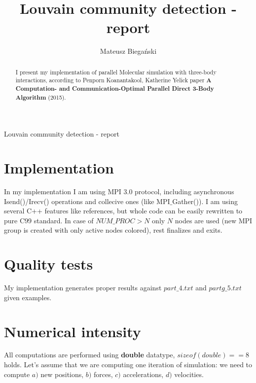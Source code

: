 \documentclass[12pt]{article}
\begin{document}

\author{Mateusz Biegański}
\title{Louvain community detection - report}
\maketitle

\begin{center}
    \Large Louvain community detection - report \normalsize
\end{center}

\begin{abstract}
    \par I present my implementation of parallel Molecular simulation with three-body interactions, according to Penporn Koanantakool, Katherine Yelick paper \textbf{A Computation- and Communication-Optimal Parallel Direct 3-Body Algorithm} (2015).
\end{abstract}


\section*{\fontsize{18}{18}\selectfont Implementation}

In my implementation I am using MPI 3.0 protocol, including asynchronous Isend()/Irecv() operations and collecive ones (like MPI$\_$Gather()). I am using several C++ features like references, but whole code can be easily rewritten to pure C99 standard. In case of $NUM\_PROC > N$ only $N$ nodes are used (new MPI group is created with only active nodes colored), rest finalizes and exits.

\section*{\fontsize{18}{18}\selectfont Quality tests}
My implementation generates proper results against $part\_4.txt$ and $partg\_5.txt$ given examples.

\section*{\fontsize{18}{18}\selectfont Numerical intensity}

All computations are performed using \textbf{double} datatype, $sizeof(double) == 8$ holds.
Let's assume that we are computing one iteration of simulation: we need to compute $a)$ new positions, $b)$ forces, $c)$ accelerations, $d)$ velocities.
\end{document}
